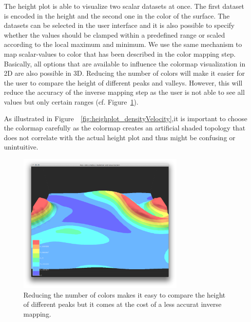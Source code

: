 The height plot is able to visualize two scalar datasets at once. The first dataset is encoded in the height and the second one in the color of the surface. The datasets can be selected in the user interface and it is also possible to specify whether the values should be clamped within a predefined range or scaled according to the local maximum and minimum. 
We use the same mechanism to map scalar-values to color that has been described in the color mapping step. Basically, all options that are available to influence the colormap visualization in 2D are also possible in 3D. Reducing the number of colors will make it easier for the user to compare the height of different peaks and valleys. However, this will reduce the accuracy of the inverse mapping step as the user is not able to see all values but only certain ranges (cf. Figure~\ref{fig:figures_heightplot_densitydensitybanding}).

As illustrated in Figure~~\ref{fig:heighplot_densityVelocity},it is important to choose the colormap carefully as the colormap creates an artificial shaded topology that does not correlate with the actual height plot and thus might be confusing or unintuitive.

\begin{figure}[htbp]
    \centering \includegraphics[height=2.75in]{figures/heightplot/densitydensitybanding.png}
    \caption{Reducing the number of colors makes it easy to compare the height of different peaks but it comes at the cost of a less accurat inverse mapping.}
    \label{fig:figures_heightplot_densitydensitybanding}
\end{figure}



